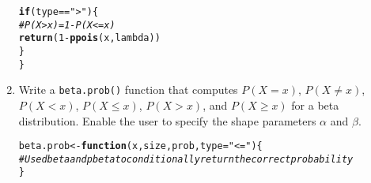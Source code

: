 \documentclass{article}\usepackage[]{graphicx}\usepackage[]{xcolor}
\makeatletter
\newcommand{\hlnum}[1]{\textcolor[rgb]{0.686,0.059,0.569}{#1}}%
\newcommand{\hlsng}[1]{\textcolor[rgb]{0.192,0.494,0.8}{#1}}%
\newcommand{\hlcom}[1]{\textcolor[rgb]{0.678,0.584,0.686}{\textit{#1}}}%
\newcommand{\hlopt}[1]{\textcolor[rgb]{0,0,0}{#1}}%
\newcommand{\hldef}[1]{\textcolor[rgb]{0.345,0.345,0.345}{#1}}%
\newcommand{\hlkwa}[1]{\textcolor[rgb]{0.161,0.373,0.58}{\textbf{#1}}}%
\newcommand{\hlkwb}[1]{\textcolor[rgb]{0.69,0.353,0.396}{#1}}%
\newcommand{\hlkwc}[1]{\textcolor[rgb]{0.333,0.667,0.333}{#1}}%
\newcommand{\hlkwd}[1]{\textcolor[rgb]{0.737,0.353,0.396}{\textbf{#1}}}%
\newenvironment{kframe}{%
 \def\at@end@of@kframe{}%
 \ifinner\ifhmode%
  \def\at@end@of@kframe{\end{minipage}}%
  \begin{minipage}{\columnwidth}%
 \fi\fi%
 \def\FrameCommand##1{\hskip\@totalleftmargin \hskip-\fboxsep
 \colorbox{shadecolor}{##1}\hskip-\fboxsep
     \hskip-\linewidth \hskip-\@totalleftmargin \hskip\columnwidth}%
 \MakeFramed {\advance\hsize-\width
   \@totalleftmargin\z@ \linewidth\hsize
   \@setminipage}}%
 {\par\unskip\endMakeFramed%
 \at@end@of@kframe}
\newenvironment{knitrout}{}{} %
\makeatother
\begin{document}
\begin{enumerate}
\begin{knitrout}
\begin{kframe}
\begin{alltt}
  \hlkwa{if} \hldef{(type} \hlopt{==} \hlsng{">"}\hldef{)\{}
    \hlcom{# P(X > x) = 1 - P(X <= x)}
    \hlkwd{return}\hldef{(}\hlnum{1}\hlopt{-}\hlkwd{ppois}\hldef{(x, lambda))}
  \hldef{\}}
\hldef{\}}
\end{alltt}
\end{kframe}
\end{knitrout}
    \item Write a \texttt{beta.prob()} function that computes $P(X=x)$, 
    $P(X \neq x)$, $P(X<x)$, $P(X \leq x)$, $P(X > x)$, and $P(X \geq x)$
    for a beta distribution. Enable the user to specify the shape parameters
    $\alpha$ and $\beta$.
\begin{knitrout}\scriptsize
{}\color{fgcolor}\begin{kframe}
\begin{alltt}
\hldef{beta.prob} \hlkwb{<-} \hlkwa{function}\hldef{(}\hlkwc{x}\hldef{,} \hlkwc{size}\hldef{,} \hlkwc{prob}\hldef{,} \hlkwc{type}\hldef{=}\hlsng{"<="}\hldef{)\{}
  \hlcom{# Use dbeta and pbeta to conditionally return the correct probability}
\hldef{\}}
\end{alltt}
\end{kframe}
\end{knitrout}
\end{enumerate}

\end{document}
